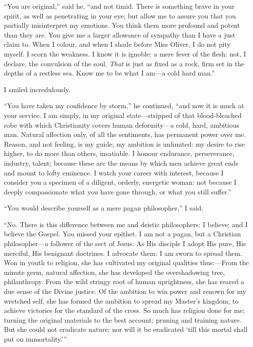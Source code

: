\enquote{You are original,} said he, \enquote{and not timid. There is
something brave in your spirit, as well as penetrating in your eye; but
allow me to assure you that you partially misinterpret my emotions. You
think them more profound and potent than they are. You give me a larger
allowance of sympathy than I have a just claim to. When I colour, and
when I shade before Miss Oliver, I do not pity myself. I scorn the
weakness. I know it is ignoble: a mere fever of the flesh: not, I
declare, the convulsion of the soul. \emph{That} is just as fixed as a
rock, firm set in the depths of a restless sea. Know me to be what I
am---a cold hard man.}

I smiled incredulously.

\enquote{You have taken my confidence by storm,} he continued,
\enquote{and now it is much at your service. I am simply, in my
original state---stripped of that blood-bleached robe with which
Christianity covers human deformity---a cold, hard, ambitious man. 
Natural affection only, of all the sentiments, has permanent power over
me. Reason, and not feeling, is my guide; my ambition is unlimited: my
desire to rise higher, to do more than others, insatiable. I honour
endurance, perseverance, industry, talent; because these are the means
by which men achieve great ends and mount to lofty eminence. I watch
your career with interest, because I consider you a specimen of a
diligent, orderly, energetic woman: not because I deeply compassionate
what you have gone through, or what you still suffer.}

\enquote{You would describe yourself as a mere pagan philosopher,} I
said.

\enquote{No. There is this difference between me and deistic
philosophers: I believe; and I believe the Gospel. You missed your
epithet. I am not a pagan, but a Christian philosopher---a follower of
the sect of Jesus. As His disciple I adopt His pure, His merciful, His
benignant doctrines. I advocate them: I am sworn to spread them. Won
in youth to religion, she has cultivated my original qualities
thus:---From the minute germ, natural affection, she has developed the
overshadowing tree, philanthropy. From the wild stringy root of human
uprightness, she has reared a due sense of the Divine justice. Of the
ambition to win power and renown for my wretched self, she has formed
the ambition to spread my Master's kingdom; to achieve victories for the
standard of the cross. So much has religion done for me; turning the
original materials to the best account; pruning and training nature. 
But she could not eradicate nature: nor will it be eradicated
\enquote{till this mortal shall put on immortality.}}

